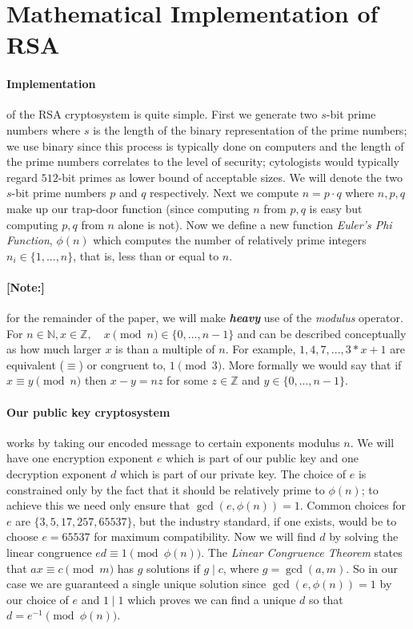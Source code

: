 \documentclass[12pt]{article}
\newcommand{\Z}{\mathbb{Z}}
\newcommand{\N}{\mathbb{N}}
\theoremstyle{remark}
\begin{document}
\section{Mathematical Implementation of RSA}

\paragraph{Implementation} of the RSA cryptosystem is quite simple.  First we generate two $s$-bit prime numbers where $s$ is the length of the binary representation of the prime numbers; we use binary since this process is typically done on computers and the length of the prime numbers correlates to the level of security; cytologists would typically regard $512$-bit primes as lower bound of acceptable sizes.  We will denote the two $s$-bit prime numbers $p$ and $q$ respectively.  Next we compute $n = p\cdot q$ where $n,p,q$ make up our trap-door function (since computing $n$ from $p,q$ is easy but computing $p,q$ from $n$ alone is not).  Now we define a new function \textit{Euler's Phi Function}, $\phi(n)$ which computes the number of relatively prime integers $n_i\in\{1,...,n\}$, that is, less than or equal to $n$.

\paragraph{[Note:]} for the remainder of the paper, we will make \textbf{\emph{heavy}} use of the \textit{modulus} operator.  For $n\in \N,x\in \Z ,\quad x\pmod{n}\in \{0,...,n-1\}$ and can be described conceptually as how much larger $x$ is than a multiple of $n$.  For example, $1,4,7,..., 3*x+1$ are equivalent ($\equiv$) or congruent to, $1\pmod{3}$.  More formally we would say that if $x\equiv y\pmod{n}$ then $x-y = nz$ for some $z\in\Z$ and $y\in \{0,...,n-1\}$.

\paragraph{Our public key cryptosystem} works by taking our encoded message to certain exponents modulus $n$.  We will have one encryption exponent $e$ which is part of our public key and one decryption exponent $d$ which is part of our private key.  The choice of $e$ is constrained only by the fact that it should be relatively prime to $\phi(n)$; to achieve this we need only ensure that $\gcd(e,\phi(n))=1$.  Common choices for $e$ are $\{3, 5, 17, 257, 65537\}$, but the industry standard, if one exists, would be to choose $e=65537$ for maximum compatibility.  Now we will find $d$ by solving the linear congruence $ed \equiv 1 \pmod{\phi(n)}$.  The \textit{Linear Congruence Theorem} states that $ax \equiv c \pmod{m}$ has $g$ solutions if $g \mid c$, where $g=\gcd(a,m)$.  So in our case we are guaranteed a single unique solution since $\gcd(e,\phi(n))=1$ by our choice of $e$ and $1\mid 1$ which proves we can find a unique $d$ so that $d=e^{-1}\pmod{\phi(n)}$.
\end{document}
